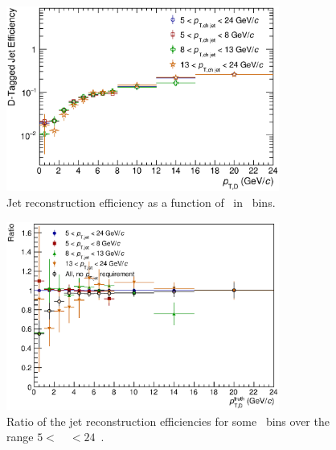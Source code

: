 \begin{figure}[tbh]
\begin{center}
\includegraphics[width=0.8\textwidth]{img/HQ16_Simulation_EfficiencyVsDPt_LogScale}
 \caption{Jet reconstruction efficiency as a function of \ptd\ in \ptchjet\ bins.} 
 \label{fig:HQ16_Simulation_EfficiencyVsDPt_LogScale}
\end{center}
\end{figure}

\begin{figure}[tbh]
\begin{center}
\includegraphics[width=0.8\textwidth]{img/D0_Jet_AKTChargedR040_pt_scheme_D_Spectra_PartialEfficiencyRatios}
 \caption{Ratio of the jet reconstruction efficiencies for some \ptchjet\ bins over the range $5<$~\ptchjet~$<24$~\GeVc.} 
 \label{fig:D0_Jet_AKTChargedR040_pt_scheme_D_Spectra_PartialEfficiencyRatios}
\end{center}
\end{figure}


